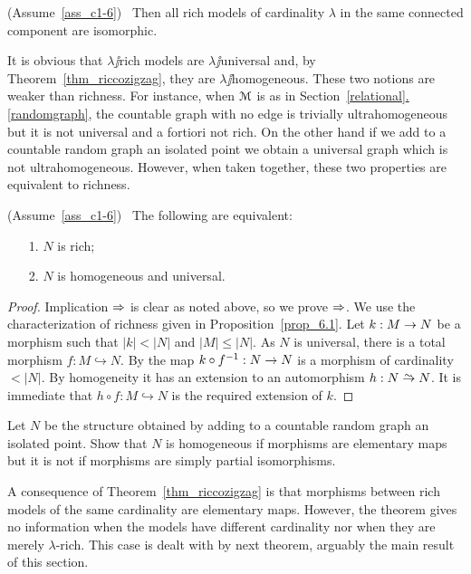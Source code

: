\documentclass[creche.tex]{subfiles}
\begin{document}
\begin{corollary}\label{coroll_riccozigzag}
(Assume~\ref{ass_c1-6})  \  Then all rich models of cardinality $\lambda$ in the same connected component are isomorphic.\QED
\end{corollary}

It is obvious that $\lambda\jj$rich models are $\lambda\jj$universal and, by Theorem~\ref{thm_riccozigzag}, they are $\lambda\jj$ho\-mo\-ge\-ne\-ous.
These two notions are weaker than richness.
For instance, when $\EuScript M$ is as in Section~\hyperref[randomgraph]{\ref*{relational}.\ref*{randomgraph}}, the countable graph with no edge is trivially ultrahomogeneous but it is not universal and a fortiori not rich.
On the other hand if we add to a countable random graph an isolated point we obtain a universal graph which is not ultrahomogeneous.
However, when taken together, these two properties are equivalent to richness.

\begin{theorem}\label{ricco<->universaleomogeneo}
(Assume~\ref{ass_c1-6}) \ The following are equivalent:
\begin{itemize}
\item[1.] $N$ is rich;
\item[2.] $N$ is homogeneous and universal.
\end{itemize}
\end{theorem}
\begin{proof} 
Implication $\Rightarrow$ is clear as noted above, so we prove $\Rightarrow$.
We use the characterization of richness given in Proposition~\ref{prop_6.1}.
Let $k:M\rightarrow N$ be a morphism such that $|k|<|N|$ and $|M|\le|N|$.
As $N$ is universal, there is a total morphism \hbox{$f:M\hookrightarrow N$}.
By  the map $k\circ f^{-1}:N\rightarrow N$ is a morphism of cardinality $<|N|$.
By homogeneity it has an extension to an automorphism $h:N\isomap N$.
It is immediate that $h\circ f:M\hookrightarrow N$ is the required extension of $k$.
\end{proof}


\begin{exercise}
Let $N$ be the structure obtained by adding to a countable random graph an isolated point.
Show that $N$ is homogeneous if morphisms are elementary maps but it is not if morphisms are simply partial isomorphisms.\QED
\end{exercise}

A consequence of Theorem~\ref{thm_riccozigzag} is that morphisms between rich models of the same cardinality are elementary maps.
However, the theorem gives no information when the models have different cardinality nor when they are merely $\lambda$-rich.
This case is dealt with by next theorem, arguably the main result of this section.
\end{document}
